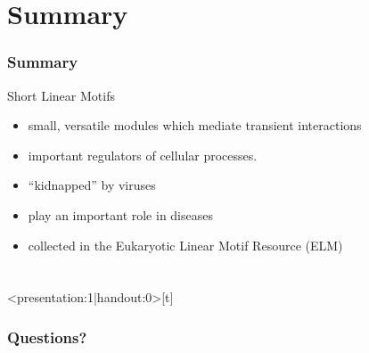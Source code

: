 \documentclass{beamer}
\begin{document}
\section{Summary} 
\begin{frame}\frametitle{Summary} 
    \begin{block}{Short Linear Motifs}
        \begin{itemize}
        \item small, versatile modules which mediate transient interactions
        \item important regulators of cellular processes.
        \item ``kidnapped'' by viruses
        \item play an important role in diseases
        \item collected in the Eukaryotic Linear Motif Resource (ELM)
        \end{itemize}
    \end{block} 
\end{frame}

\appendix

\section{}
\begin{frame}<presentation:1|handout:0>[t]\frametitle{Questions?}
    \note{~}
    \begin{center}
    \end{center}
\end{frame}
%
\end{document}
